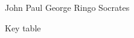 \documentclass[a4paper,answers,addpoints]{exam}
\begin{document}
\begin{questions}
\begin{oneparcheckboxes}%
\choice John
\choice Paul
\choice George
\choice Ringo
\CorrectChoice Socrates
\end{oneparcheckboxes}


\end{questions}

\hrulefill

%

Key table

\printkeytable


\writekeylist{\mykeylist}
\end{document}
